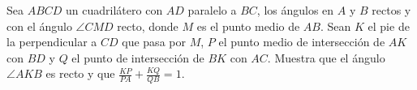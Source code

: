 Sea $ABCD$ un cuadrilátero con $AD$ paralelo a $BC$, los ángulos en $A$ y $B$ rectos y con el ángulo $\angle CMD$ recto, donde $M$ es el punto medio de $AB$. Sean $K$ el pie de la perpendicular a $CD$ que pasa por $M$, $P$ el punto medio de intersección de $AK$ con $BD$ y $Q$ el punto de intersección de $BK$ con $AC$. Muestra que el ángulo $\angle AKB$ es recto y que $\frac{KP}{PA} + \frac{KQ}{QB}=1$.